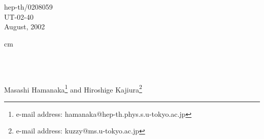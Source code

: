 \documentclass[a4paper,epsf,12pt]{article}
\begin{document}
\begin{titlepage}
\thispagestyle{empty}
\begin{flushright}
hep-th/0208059\\
UT-02-40\\
August, 2002 \\
\end{flushright}

 cm

\begin{center}
\\
\noindent{
 }\\
\renewcommand{\thefootnote}{\fnsymbol{footnote}}

\vskip 2cm

{\large Masashi Hamanaka\footnote{e-mail address:
    hamanaka@hep-th.phys.s.u-tokyo.ac.jp} and 
    Hiroshige Kajiura\footnote{e-mail address:
    kuzzy@ms.u-tokyo.ac.jp}}%
\vspace{15mm}


\myHighlight{${}^{*}$}

\vspace{6mm}

\myHighlight{${}^{\dag}$}

\vskip 1.5cm
\end{center}
\begin{abstract}
We discuss gauge fields on tori in diverse dimensions, 
mainly in two and four dimensions.
We construct various explicit gauge fields which have
some topological charges
and find the Dirac zero modes in the background
of the gauge fields.
By using the zero mode,
we give new gauge fields on the dual torus,
which is a gauge theoretical description of T-duality 
transformation of the corresponding D-brane systems
including D\=D systems. 
{}From the transformation,
we can easily see the duality 
expected from the index theorem. 
It is also mentioned that, for each topological charges, the 
corresponding constant curvature bundle can be constructed 
and their duality transformation can be performed 
in terms of Heisenberg modules. 

\end{abstract}
\vfill
 
\end{titlepage}
\vfill
\setcounter{footnote}{0}
\renewcommand{\thefootnote}{\arabic{footnote}}
\newpage
\end{document}
